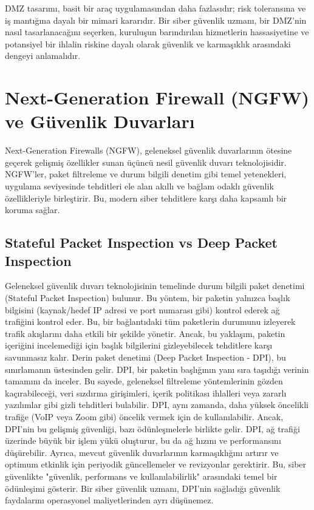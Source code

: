 DMZ tasarımı, basit bir araç uygulamasından daha fazlasıdır; risk toleransına ve iş mantığına dayalı bir mimari kararıdır. Bir siber güvenlik uzmanı, bir DMZ'nin nasıl tasarlanacağını seçerken, kuruluşun barındırılan hizmetlerin hassasiyetine ve potansiyel bir ihlalin riskine dayalı olarak güvenlik ve karmaşıklık arasındaki dengeyi anlamalıdır.

\section{Next-Generation Firewall (NGFW) ve Güvenlik Duvarları}

Next-Generation Firewalls (NGFW), geleneksel güvenlik duvarlarının ötesine geçerek gelişmiş özellikler sunan üçüncü nesil güvenlik duvarı teknolojisidir. NGFW'ler, paket filtreleme ve durum bilgili denetim gibi temel yetenekleri, uygulama seviyesinde tehditleri ele alan akıllı ve bağlam odaklı güvenlik özellikleriyle birleştirir. Bu, modern siber tehditlere karşı daha kapsamlı bir koruma sağlar.

\subsection{Stateful Packet Inspection vs Deep Packet Inspection}

Geleneksel güvenlik duvarı teknolojisinin temelinde durum bilgili paket denetimi (Stateful Packet Inspection) bulunur. Bu yöntem, bir paketin yalnızca başlık bilgisini (kaynak/hedef IP adresi ve port numarası gibi) kontrol ederek ağ trafiğini kontrol eder. Bu, bir bağlantıdaki tüm paketlerin durumunu izleyerek trafik akışlarını daha etkili bir şekilde yönetir. Ancak, bu yaklaşım, paketin içeriğini incelemediği için başlık bilgilerini gizleyebilecek tehditlere karşı savunmasız kalır.
Derin paket denetimi (Deep Packet Inspection - DPI), bu sınırlamanın üstesinden gelir. DPI, bir paketin başlığının yanı sıra taşıdığı verinin tamamını da inceler. Bu sayede, geleneksel filtreleme yöntemlerinin gözden kaçırabileceği, veri sızdırma girişimleri, içerik politikası ihlalleri veya zararlı yazılımlar gibi gizli tehditleri bulabilir. DPI, aynı zamanda, daha yüksek öncelikli trafiğe (VoIP veya Zoom gibi) öncelik vermek için de kullanılabilir.
Ancak, DPI'nin bu gelişmiş güvenliği, bazı ödünleşmelerle birlikte gelir. DPI, ağ trafiği üzerinde büyük bir işlem yükü oluşturur, bu da ağ hızını ve performansını düşürebilir. Ayrıca, mevcut güvenlik duvarlarının karmaşıklığını artırır ve optimum etkinlik için periyodik güncellemeler ve revizyonlar gerektirir. Bu, siber güvenlikte "güvenlik, performans ve kullanılabilirlik" arasındaki temel bir ödünleşimi gösterir. Bir siber güvenlik uzmanı, DPI'nin sağladığı güvenlik faydalarını operasyonel maliyetlerinden ayrı düşünemez.

